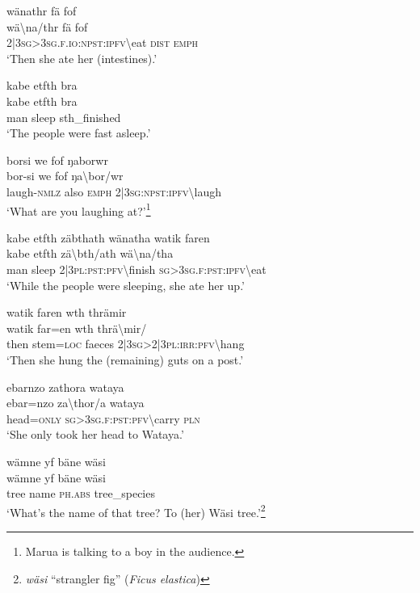 \ea\label{ex:6:a1288}
wänathr fä fof\\
\gll wä{\textbackslash}na/thr	fä	fof\\
     2|3\textsc{sg}>3\textsc{sg}.\textsc{f}.\textsc{io}:\textsc{npst}:\textsc{ipfv}{\textbackslash}eat	\textsc{dist}	\textsc{emph}\\
\glt `Then she ate her (intestines).'
\z

\ea\label{ex:6:a1289}
kabe etfth bra\\
\gll kabe	etfth	bra\\
     man	sleep	sth\_finished\\
\glt `The people were fast asleep.'
\z

\ea\label{ex:6:a1290}
borsi we fof ŋaborwr\\
\gll bor-si	we	fof	ŋa{\textbackslash}bor/wr\\
     laugh-\textsc{nmlz}	also	\textsc{emph}	2|3\textsc{sg}:\textsc{npst}:\textsc{ipfv}{\textbackslash}laugh\\
\glt `What are you laughing at?'\footnote{Marua is talking to a boy in the audience.}
\z

\ea\label{ex:6:a1291}
kabe etfth zäbthath wänatha watik faren\\
\gll kabe	etfth	zä{\textbackslash}bth/ath	wä{\textbackslash}na/tha\\
     man	sleep	2|3\textsc{pl}:\textsc{pst}:\textsc{pfv}{\textbackslash}finish	\textsc{sg}>3\textsc{sg}.\textsc{f}:\textsc{pst}:\textsc{ipfv}{\textbackslash}eat\\
\glt `While the people were sleeping, she ate her up.'
\z

\ea\label{ex:6:a1292}
watik faren wth thrämir\\
\gll watik	far=en	wth	thrä{\textbackslash}mir/\\
     then	stem=\textsc{loc}	faeces	2|3\textsc{sg}>2|3\textsc{pl}:\textsc{irr}:\textsc{pfv}{\textbackslash}hang\\
\glt `Then she hung the (remaining) guts on a post.'
\z

\ea\label{ex:6:a1293}
ebarnzo zathora wataya\\
\gll ebar=nzo	za{\textbackslash}thor/a	wataya\\
     head=\textsc{only}	\textsc{sg}>3\textsc{sg}.\textsc{f}:\textsc{pst}:\textsc{pfv}{\textbackslash}carry	\textsc{pln}\\
\glt `She only took her head to Wataya.'
\z

\ea\label{ex:6:a1294}
wämne yf bäne wäsi\\
\gll wämne	yf	bäne	wäsi\\
     tree	name	\textsc{ph}.\textsc{abs}	tree\_species\\
\glt `What's the name of that tree? To (her) Wäsi tree.'\footnote{\textit{wäsi} ``strangler fig'' (\textit{Ficus elastica})}
\z

